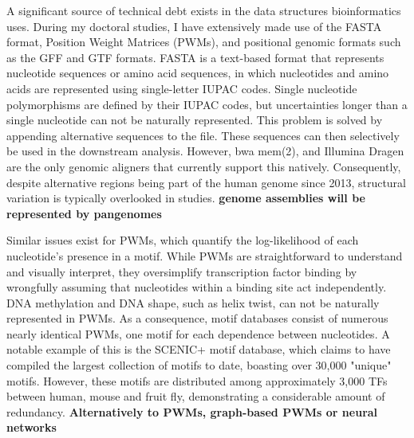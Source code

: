 A significant source of technical debt exists in the data structures bioinformatics uses. During my doctoral studies, I have extensively made use of the FASTA format, Position Weight Matrices (PWMs), and positional genomic formats such as the GFF and GTF formats. FASTA is a text-based format that represents nucleotide sequences or amino acid sequences, in which nucleotides and amino acids are represented using single-letter IUPAC codes\cite{Lipman1985}. Single nucleotide polymorphisms are defined by their IUPAC codes, but uncertainties longer than a single nucleotide can not be naturally represented. This problem is solved by appending alternative sequences to the file. These sequences can then selectively be used in the downstream analysis. However, bwa mem(2)\cite{bwamem,bwamem2}, and Illumina Dragen are the only genomic aligners that currently support this natively. Consequently, despite alternative regions being part of the human genome since 2013, structural variation is typically overlooked in studies.\textbf{ genome assemblies will be represented by pangenomes\cite{Li2020}}

Similar issues exist for PWMs, which quantify the log-likelihood of each nucleotide's presence in a motif. While PWMs are straightforward to understand and visually interpret, they oversimplify transcription factor binding by wrongfully assuming that nucleotides within a binding site act independently\cite{Zuo2014,Jolma2015,Inukai2017}. DNA methylation and DNA shape, such as helix twist, can not be naturally represented in PWMs. As a consequence, motif databases consist of numerous nearly identical PWMs, one motif for each dependence between nucleotides. A notable example of this is the SCENIC+ motif database\cite{BravoGonzlezBlas2023}, which claims to have compiled the largest collection of motifs to date, boasting over 30,000 "unique" motifs. However, these motifs are distributed among approximately 3,000 TFs between human, mouse and fruit fly, demonstrating a considerable amount of redundancy. \textbf{Alternatively to PWMs, graph-based PWMs\cite{Siebert2016} or neural networks\cite{Novakovsky2023,https://doi.org/10.48550/arxiv.1704.02685}}

